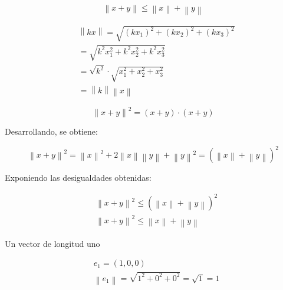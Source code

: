 \begin{equation}
	\left\lVert x+y \right\rVert \leq \left\lVert x \right\rVert+\left\lVert y \right\rVert
\end{equation}

\begin{exercise}
	\begin{align*}
		 & \left\lVert kx \right\rVert=\sqrt{\left(kx_1\right)^2+\left(kx_2\right)^2+\left(kx_3\right)^2} \\
		 & =\sqrt{k^2x^2_1+k^2x^2_2+k^2x^2_3}                                                             \\
		 & =\sqrt{k^2}\cdot\sqrt{x^2_1+x^2_2+x^2_3}                                                       \\
		 & =\left\lVert k \right\rVert\left\lVert x \right\rVert
	\end{align*}
\end{exercise}

\begin{equation}
	\left\lVert x+y \right\rVert^2=\left(x+y\right)\cdot \left(x+y\right)
\end{equation}

Desarrollando, se obtiene:

\begin{equation*}
	\left\lVert x+y \right\rVert^2=\left\lVert x \right\rVert^2+ 2\left\lVert x\right\rVert\left\lVert y \right\rVert+\left\lVert y \right\rVert^2=\left(\left\lVert x\right\rVert+\left\lVert y \right\rVert\right)^2
\end{equation*}

Exponiendo las desigualdades obtenidas:

\begin{align*}
	 & \left\lVert x+y \right\rVert^2\leq \left(\left\lVert x\right\rVert+\left\lVert y \right\rVert\right)^2 \\
	 & \left\lVert x+y \right\rVert^2\leq \left\lVert x\right\rVert + \left\lVert y \right\rVert
\end{align*}

\begin{definition}
	Un vector de longitud uno
\end{definition}

\begin{example}
	\begin{align*}
		 & e_1=(1,0,0)                                                \\
		 & \left\lVert e_1 \right\rVert=\sqrt{1^2+0^2+0^2}=\sqrt{1}=1
	\end{align*}
\end{example}

